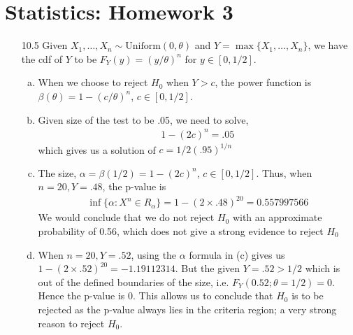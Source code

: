 \documentclass[a4paper,10pt]{article}
\theoremstyle{definition}
\begin{document}
\section*{Statistics: Homework 3}

\begin{enumerate}
\item[10.5] Given $X_1,\ldots,X_n \sim \text{Uniform}(0, \theta)$ and $Y = \max\{X_1,\ldots,X_n\}$, we have the cdf of $Y$ to be $F_Y(y)=(y/\theta)^n$ for $y \in [0,1/2]$.
\begin{enumerate}[(a)]
\item When we choose to reject $H_0$ when $Y>c$, the power function is $\beta(\theta) = 1-(c/\theta)^n$, $c \in [0,1/2]$.
\item Given size of the test to be .05, we need to solve,
\begin{align*}
1-(2c)^n = .05
\end{align*}
which gives us a solution of $c = 1/2(.95)^{1/n}$

\item The size, $\alpha = \beta(1/2) = 1- (2c)^{n}$, $c \in [0,1/2]$. Thus, when $n=20, Y = .48$, the p-value is 
\begin{align*}
\inf\{ \alpha:X^n \in R_\alpha\} = 1-(2 \times.48)^{20} = 0.557997566
\end{align*}
We would conclude that we do not reject $H_0$ with an approximate probability of 0.56, which does not give a strong evidence to reject $H_0$
\item When $n=20, Y = .52$, using the $\alpha$ formula in (c) gives us $1-(2\times.52)^{20} = -1.19112314$. But the given $Y=.52>1/2$ which is out of the defined boundaries of the size, i.e. $F_Y(0.52; \theta=1/2)=0$. Hence the p-value is 0. This allows us to conclude that $H_0$ is to be rejected as the p-value always lies in the criteria region; a very strong reason to reject $H_0$.
\end{enumerate}


\end{enumerate}
\end{document}
